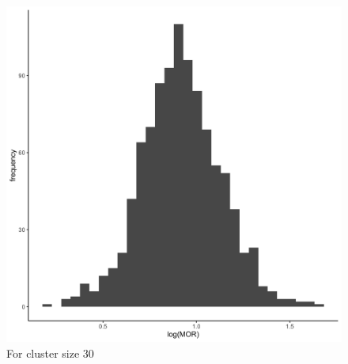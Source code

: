 \documentclass[
  letterpaper,
  DIV=11,
  numbers=noendperiod,
  titlepage]{scrartcl}
\begin{document}
\begin{figure}
\begin{minipage}[t]{0.50\linewidth}
{{\includegraphics{../../plots/two-lvl-ran-slope/high-prev/hist_30_30_two_lvl_slp_high_prev.png}

}

\caption{For cluster size 30}

}

\end{minipage}%
%
\begin{minipage}[t]{0.50\linewidth}

{\centering 

}
\end{minipage}
\end{figure}
\end{document}
